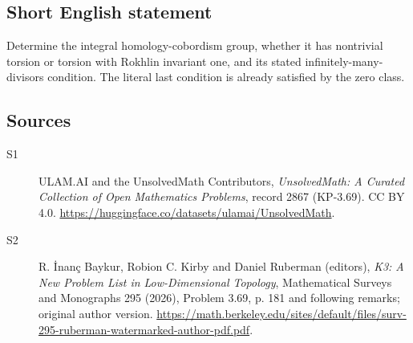 \documentclass[11pt]{article}
\begin{document}
\subsection{Short English statement}
Determine the integral homology-cobordism group, whether it has nontrivial torsion or torsion with Rokhlin invariant one, and its stated infinitely-many-divisors condition. The literal last condition is already satisfied by the zero class.
\subsection{Sources}
\begin{description}
\item[\hypertarget{source:2867:1}{S1}] ULAM.AI and the UnsolvedMath Contributors, \emph{UnsolvedMath: A Curated Collection of Open Mathematics Problems}, record 2867 (KP-3.69). CC BY 4.0. \url{https://huggingface.co/datasets/ulamai/UnsolvedMath}.
\item[\hypertarget{source:2867:2}{S2}] R. İnanç Baykur, Robion C. Kirby and Daniel Ruberman (editors), \emph{K3: A New Problem List in Low-Dimensional Topology}, Mathematical Surveys and Monographs 295 (2026), Problem 3.69, p. 181 and following remarks; original author version. \url{https://math.berkeley.edu/sites/default/files/surv-295-ruberman-watermarked-author-pdf.pdf}.
\end{description}
\label{end:2867}
\end{document}
